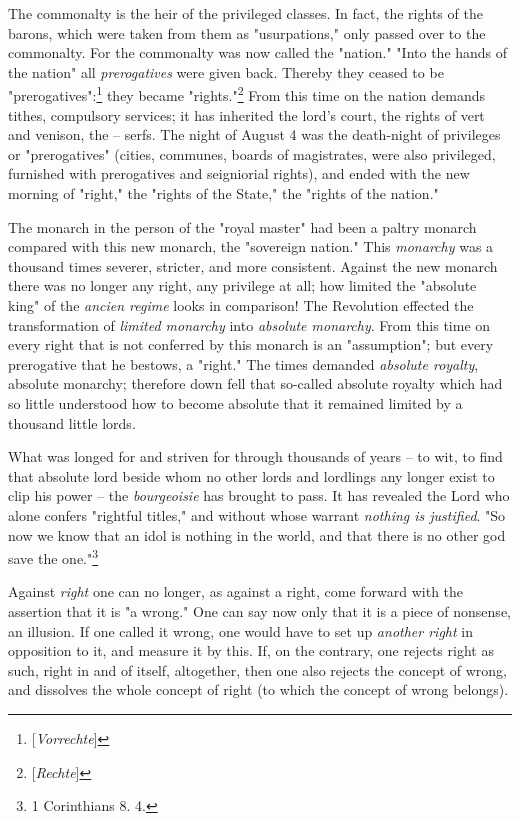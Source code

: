 The commonalty is the heir of the privileged classes. In fact, the rights of 
the barons, which were taken from them as "{}usurpations,"{} only passed over 
to the commonalty. For the commonalty was now called the "{}nation."{} "{}Into 
the hands of the nation"{} all \textit{prerogatives} were given back. Thereby 
they ceased to be "{}prerogatives"{}:\footnote{[\textit{Vorrechte}]} they 
became "{}rights."{}\footnote{[\textit{Rechte}]} From this time on the nation 
demands tithes, compulsory services; it has inherited the lord's court, the 
rights of vert and venison, the -- serfs. The night of August 4 was the 
death-night of privileges or "{}prerogatives"{} (cities, communes, boards of 
magistrates, were also privileged, furnished with prerogatives and seigniorial 
rights), and ended with the new morning of "{}right,"{} the "{}rights of the 
State,"{} the "{}rights of the nation."{}

The monarch in the person of the "{}royal master"{} had been a paltry monarch 
compared with this new monarch, the "{}sovereign nation."{} This 
\textit{monarchy} was a thousand times severer, stricter, and more consistent. 
Against the new monarch there was no longer any right, any privilege at all; 
how limited the "{}absolute king"{} of the \textit{ancien regime} looks in 
comparison! The Revolution effected the transformation of \textit{limited 
monarchy} into \textit{absolute monarchy}. From this time on every right that 
is not conferred by this monarch is an "{}assumption"{}; but every prerogative 
that he bestows, a "{}right."{} The times demanded \textit{absolute royalty}, 
absolute monarchy; therefore down fell that so-called absolute royalty which 
had so little understood how to become absolute that it remained limited by a 
thousand little lords.

What was longed for and striven for through thousands of years -- to wit, to 
find that absolute lord beside whom no other lords and lordlings any longer 
exist to clip his power -- the \textit{bourgeoisie} has brought to pass. It 
has revealed the Lord who alone confers "{}rightful titles,"{} and without 
whose warrant \textit{nothing is justified}. "{}So now we know that an idol is 
nothing in the world, and that there is no other god save the 
one."{}\footnote{1 Corinthians 8. 4.}

Against \textit{right} one can no longer, as against a right, come forward 
with the assertion that it is "{}a wrong."{} One can say now only that it is a 
piece of nonsense, an illusion. If one called it wrong, one would have to set 
up \textit{another right} in opposition to it, and measure it by this. If, on 
the contrary, one rejects right as such, right in and of itself, altogether, 
then one also rejects the concept of wrong, and dissolves the whole concept of 
right (to which the concept of wrong belongs).

